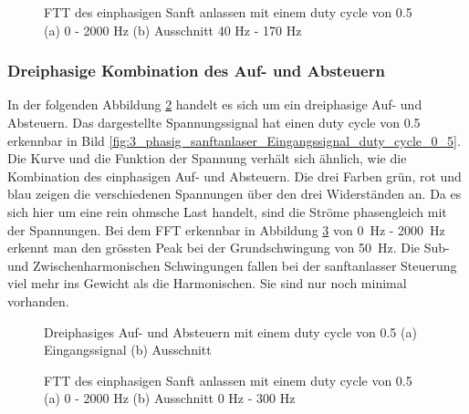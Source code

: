 \begin{figure}[ht!]
	\centering
	\qquad
	\caption{FTT des einphasigen Sanft anlassen mit einem duty cycle von 0.5 (a) 0 - 2000 Hz (b) Ausschnitt 40 Hz - 170 Hz}
	\label{fig:einphasiges_Sanft_anlassen_FTT}
\end{figure}




\subsubsection{Dreiphasige Kombination des Auf- und Absteuern}

In der folgenden Abbildung \ref{fig:drei_phasiges_Sanft_anlassen} handelt es sich um ein dreiphasige Auf- und Absteuern. Das dargestellte Spannungssignal hat einen duty cycle von 0.5 erkennbar in Bild \ref{fig:3_phasig_sanftanlaser_Eingangssignal_duty_cycle_0_5}. Die Kurve und die Funktion der Spannung verhält sich ähnlich, wie die Kombination des einphasigen Auf- und Absteuern. Die drei Farben grün, rot und blau zeigen die verschiedenen Spannungen über den drei Widerständen an. Da es sich hier um eine rein ohmsche Last handelt, sind die Ströme phasengleich  mit der Spannungen. Bei dem FFT erkennbar in Abbildung \ref{fig:dreiphasiges_Sanft_anlassen_FTT} von \SI{0}{Hz} - \SI{2000}{Hz} erkennt man den grössten Peak bei der Grundschwingung von \SI{50}{Hz}. Die Sub- und Zwischenharmonischen Schwingungen fallen bei der sanftanlasser Steuerung viel mehr ins Gewicht als die Harmonischen. Sie sind nur noch minimal vorhanden.   


\begin{figure}[ht!]
	\centering
	\qquad
	\caption{Dreiphasiges Auf- und Absteuern mit einem duty cycle von 0.5 (a) Eingangssignal (b) Ausschnitt}
	\label{fig:drei_phasiges_Sanft_anlassen}
\end{figure}

\begin{figure}[ht!]
	\centering
	\qquad
	\caption{FTT des einphasigen Sanft anlassen mit einem duty cycle von 0.5 (a) 0 - 2000 Hz (b) Ausschnitt 0 Hz - 300 Hz}
	\label{fig:dreiphasiges_Sanft_anlassen_FTT}
\end{figure}





